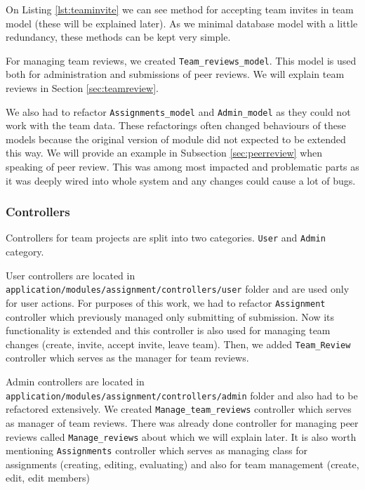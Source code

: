 On Listing \ref{lst:teaminvite} we can see method for accepting team invites in team model (these will be explained later). As we minimal database model with a little redundancy, these methods can be kept very simple.


For managing team reviews, we created \texttt{Team\_reviews\_model}. This model is used both for administration and submissions of peer reviews. We will explain team reviews in Section \ref{sec:teamreview}.

We also had to refactor \texttt{Assignments\_model} and \texttt{Admin\_model} as they could not work with the team data. These refactorings often changed behaviours of these models because the original version of module did not expected to be extended this way. We will provide an example in Subsection \ref{sec:peerreview} when speaking of peer review. This was among most impacted and problematic parts as it was deeply wired into whole system and any changes could cause a lot of bugs.

\subsubsection{Controllers}
Controllers for team projects are split into two categories. \texttt{User} and \texttt{Admin} category.

User controllers are located in \\ \texttt{application/modules/assignment/controllers/user} folder and are used only for user actions. For purposes of this work, we had to refactor \texttt{Assignment} controller which previously managed only submitting of submission. Now its functionality is extended and this controller is also used for managing team changes (create, invite, accept invite, leave team). Then, we added \texttt{Team\_Review} controller which serves as the manager for team reviews.

Admin controllers are located in \\ \texttt{application/modules/assignment/controllers/admin} folder and also had to be refactored extensively. We created \texttt{Manage\_team\_reviews} controller which serves as manager of team reviews. There was already done controller for managing peer reviews called \texttt{Manage\_reviews} about which we will explain later. It is also worth mentioning \texttt{Assignments} controller which serves as managing class for assignments (creating, editing, evaluating) and also for team management (create, edit, edit members)

